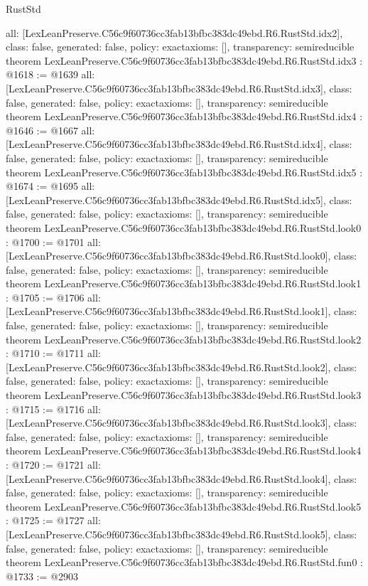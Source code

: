 \begin{lexlean}{RustStd}
\begin{coremodule}
{  all: [LexLeanPreserve.C56c9f60736cc3fab13bfbc383dc49ebd.R6.RustStd.idx2],
  class: false,
  generated: false,
  policy: exact{axioms: []},
  transparency: semireducible
}
theorem LexLeanPreserve.C56c9f60736cc3fab13bfbc383dc49ebd.R6.RustStd.idx3 : @1618 := @1639 {
  all: [LexLeanPreserve.C56c9f60736cc3fab13bfbc383dc49ebd.R6.RustStd.idx3],
  class: false,
  generated: false,
  policy: exact{axioms: []},
  transparency: semireducible
}
theorem LexLeanPreserve.C56c9f60736cc3fab13bfbc383dc49ebd.R6.RustStd.idx4 : @1646 := @1667 {
  all: [LexLeanPreserve.C56c9f60736cc3fab13bfbc383dc49ebd.R6.RustStd.idx4],
  class: false,
  generated: false,
  policy: exact{axioms: []},
  transparency: semireducible
}
theorem LexLeanPreserve.C56c9f60736cc3fab13bfbc383dc49ebd.R6.RustStd.idx5 : @1674 := @1695 {
  all: [LexLeanPreserve.C56c9f60736cc3fab13bfbc383dc49ebd.R6.RustStd.idx5],
  class: false,
  generated: false,
  policy: exact{axioms: []},
  transparency: semireducible
}
theorem LexLeanPreserve.C56c9f60736cc3fab13bfbc383dc49ebd.R6.RustStd.look0 : @1700 := @1701 {
  all: [LexLeanPreserve.C56c9f60736cc3fab13bfbc383dc49ebd.R6.RustStd.look0],
  class: false,
  generated: false,
  policy: exact{axioms: []},
  transparency: semireducible
}
theorem LexLeanPreserve.C56c9f60736cc3fab13bfbc383dc49ebd.R6.RustStd.look1 : @1705 := @1706 {
  all: [LexLeanPreserve.C56c9f60736cc3fab13bfbc383dc49ebd.R6.RustStd.look1],
  class: false,
  generated: false,
  policy: exact{axioms: []},
  transparency: semireducible
}
theorem LexLeanPreserve.C56c9f60736cc3fab13bfbc383dc49ebd.R6.RustStd.look2 : @1710 := @1711 {
  all: [LexLeanPreserve.C56c9f60736cc3fab13bfbc383dc49ebd.R6.RustStd.look2],
  class: false,
  generated: false,
  policy: exact{axioms: []},
  transparency: semireducible
}
theorem LexLeanPreserve.C56c9f60736cc3fab13bfbc383dc49ebd.R6.RustStd.look3 : @1715 := @1716 {
  all: [LexLeanPreserve.C56c9f60736cc3fab13bfbc383dc49ebd.R6.RustStd.look3],
  class: false,
  generated: false,
  policy: exact{axioms: []},
  transparency: semireducible
}
theorem LexLeanPreserve.C56c9f60736cc3fab13bfbc383dc49ebd.R6.RustStd.look4 : @1720 := @1721 {
  all: [LexLeanPreserve.C56c9f60736cc3fab13bfbc383dc49ebd.R6.RustStd.look4],
  class: false,
  generated: false,
  policy: exact{axioms: []},
  transparency: semireducible
}
theorem LexLeanPreserve.C56c9f60736cc3fab13bfbc383dc49ebd.R6.RustStd.look5 : @1725 := @1727 {
  all: [LexLeanPreserve.C56c9f60736cc3fab13bfbc383dc49ebd.R6.RustStd.look5],
  class: false,
  generated: false,
  policy: exact{axioms: []},
  transparency: semireducible
}
theorem LexLeanPreserve.C56c9f60736cc3fab13bfbc383dc49ebd.R6.RustStd.fun0 : @1733 := @2903 {
}
\end{coremodule}
\end{lexlean}
